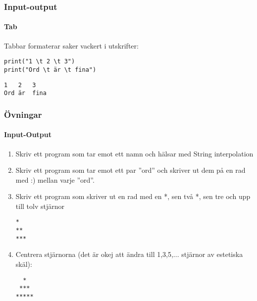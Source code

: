 \documentclass{beamer}
\begin{document}
\begin{frame}[fragile]
\frametitle{Input-output}
\framesubtitle{Tab}

Tabbar formaterar saker vackert i utskrifter:

\begin{lstlisting}
print("1 \t 2 \t 3")
print("Ord \t är \t fina")
\end{lstlisting}

\begin{lstlisting}
1	2	3
Ord	är	fina
\end{lstlisting}

\end{frame}

\begin{frame}[fragile]
\frametitle{Övningar}
\framesubtitle{Input-Output}
\begin{enumerate}
\item Skriv ett program som tar emot ett namn och hälsar med String interpolation
\item Skriv ett program som tar emot ett par ''ord'' och skriver ut dem på en rad med :) mellan varje ''ord''.
\item Skriv ett program som skriver ut en rad med en *, sen två *, sen tre och upp till tolv stjärnor
\begin{lstlisting}
*
**
***
\end{lstlisting}
\item Centrera stjärnorna (det är okej att ändra till 1,3,5,... stjärnor av estetiska skäl):
\begin{lstlisting}
  *
 ***
*****
\end{lstlisting}
\end{enumerate}

\end{frame}
\end{document}
